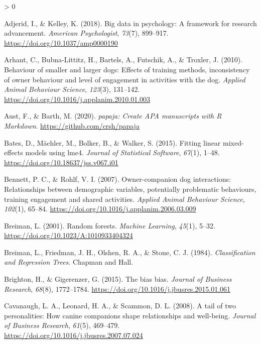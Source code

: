 \documentclass[
  english,
  ,pub,floatsintext]{apa6}
\newlength{\cslhangindent}
\newenvironment{CSLReferences}[2] %
 {%
  \setlength{\parindent}{0pt}
  \ifodd #1 \everypar{\setlength{\hangindent}{\cslhangindent}}\ignorespaces\fi
  \ifnum #2 > 0
  \setlength{\parskip}{#2\baselineskip}
  \fi
 }%
 {}
\begin{document}
\hypertarget{refs}{}
\begin{CSLReferences}{1}{0}
\leavevmode\hypertarget{ref-Adjerid.Kelley.2018}{}%
Adjerid, I., \& Kelley, K. (2018). Big data in psychology: {A} framework for research advancement. \emph{American Psychologist}, \emph{73}(7), 899--917. \url{https://doi.org/10.1037/amp0000190}

\leavevmode\hypertarget{ref-Arhant.etal.2010}{}%
Arhant, C., Bubna-Littitz, H., Bartels, A., Futschik, A., \& Troxler, J. (2010). Behaviour of smaller and larger dogs: {Effects} of training methods, inconsistency of owner behaviour and level of engagement in activities with the dog. \emph{Applied Animal Behaviour Science}, \emph{123}(3), 131--142. \url{https://doi.org/10.1016/j.applanim.2010.01.003}

\leavevmode\hypertarget{ref-R-papaja}{}%
Aust, F., \& Barth, M. (2020). \emph{{papaja}: {Create} {APA} manuscripts with {R Markdown}}. \url{https://github.com/crsh/papaja}

\leavevmode\hypertarget{ref-R-lme4}{}%
Bates, D., Mächler, M., Bolker, B., \& Walker, S. (2015). Fitting linear mixed-effects models using {lme4}. \emph{Journal of Statistical Software}, \emph{67}(1), 1--48. \url{https://doi.org/10.18637/jss.v067.i01}

\leavevmode\hypertarget{ref-Bennett.Rohlf.2007}{}%
Bennett, P. C., \& Rohlf, V. I. (2007). Owner-companion dog interactions: {Relationships} between demographic variables, potentially problematic behaviours, training engagement and shared activities. \emph{Applied Animal Behaviour Science}, \emph{102}(1), 65--84. \url{https://doi.org/10.1016/j.applanim.2006.03.009}

\leavevmode\hypertarget{ref-Breiman.2001a}{}%
Breiman, L. (2001). Random forests. \emph{Machine Learning}, \emph{45}(1), 5--32. \url{https://doi.org/10.1023/A:1010933404324}

\leavevmode\hypertarget{ref-Breiman.etal.1984}{}%
Breiman, L., Friedman, J. H., Olshen, R. A., \& Stone, C. J. (1984). \emph{Classification and {Regression Trees}}. {Chapman and Hall}.

\leavevmode\hypertarget{ref-Brighton.Gigerenzer.2015}{}%
Brighton, H., \& Gigerenzer, G. (2015). The bias bias. \emph{Journal of Business Research}, \emph{68}(8), 1772--1784. \url{https://doi.org/10.1016/j.jbusres.2015.01.061}

\leavevmode\hypertarget{ref-Cavanaugh.etal.2008}{}%
Cavanaugh, L. A., Leonard, H. A., \& Scammon, D. L. (2008). A tail of two personalities: {How} canine companions shape relationships and well-being. \emph{Journal of Business Research}, \emph{61}(5), 469--479. \url{https://doi.org/10.1016/j.jbusres.2007.07.024}


\end{CSLReferences}
\end{document}
